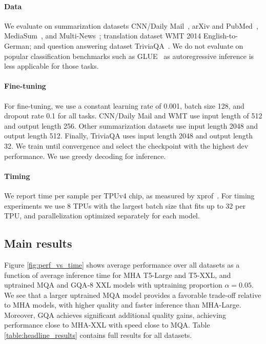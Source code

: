 \paragraph{Data}
We evaluate on summarization datasets CNN/Daily Mail~\citep{cnn}, arXiv and PubMed~\citep{arxiv}, MediaSum~\citep{mediasum}, and Multi-News~\citep{multinews}; translation dataset WMT 2014  English-to-German; and question answering dataset TriviaQA~\citep{triviaqa}. We do not evaluate on popular classification benchmarks such as GLUE~\citep{glue} as autoregressive inference is less applicable for those tasks. 

\paragraph{Fine-tuning}

For fine-tuning, we use a constant learning rate of 0.001, batch size 128, and dropout rate 0.1 for all tasks. CNN/Daily Mail and WMT use input length of 512 and output length 256. Other summarization datasets use input length 2048 and output length 512. Finally, TriviaQA uses input length 2048 and output length 32. We train until convergence and select the checkpoint with the highest dev performance. We use greedy decoding for inference.

\paragraph{Timing}
We report time per sample per TPUv4 chip, as measured by xprof~\citep{xprof}. For timing experiments we use 8 TPUs with the largest batch size that fits up to 32 per TPU, and parallelization optimized separately for each model.

\subsection{Main results}

Figure \ref{fig:perf_vs_time} shows average performance over all datasets as a function of average inference time for \textsc{MHA} T5-Large and T5-XXL, and uptrained \textsc{MQA} and \textsc{GQA}-$8$ XXL models with uptraining proportion $\alpha = 0.05$. We see that a larger uptrained \textsc{MQA} model provides a favorable trade-off relative to \textsc{MHA} models, with higher quality and faster inference than \textsc{MHA}-Large. Moreover, \textsc{GQA} achieves significant additional quality gains, achieving performance close to \textsc{MHA}-XXL with speed close to \textsc{MQA}. Table \ref{table:headline_results} contains full results for all datasets.

